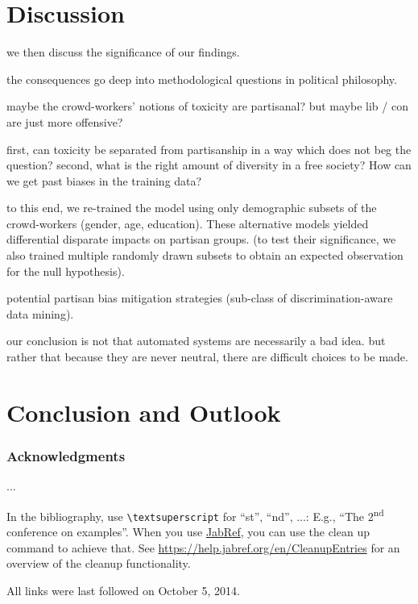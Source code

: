 \documentclass[runningheads,a4paper]{llncs}
\begin{document}
\section{Discussion}

we then discuss the significance of our findings.

the consequences go deep into methodological questions in political philosophy.

maybe the crowd-workers’ notions of toxicity are partisanal?
but maybe lib / con are just more offensive?

first, can toxicity be separated from partisanship in a way which does not beg the question?
second, what is the right amount of diversity in a free society?
How can we get past biases in the training data?

to this end, we re-trained the model using only demographic subsets of the crowd-workers (gender, age, education). These alternative models yielded differential disparate impacts on partisan groups. (to test their significance, we also trained multiple randomly drawn subsets to obtain an expected observation for the null hypothesis).

potential partisan bias mitigation strategies (sub-class of discrimination-aware data mining).

our conclusion is not that automated systems are necessarily a bad idea. but rather that because they are never neutral, there are difficult choices to be made.


\section{Conclusion and Outlook}

\subsubsection*{Acknowledgments}
...

In the bibliography, use \texttt{\textbackslash textsuperscript} for ``st'', ``nd'', ...:
E.g., \enquote{The 2\textsuperscript{nd} conference on examples}.
When you use \href{https://www.jabref.org}{JabRef}, you can use the clean up command to achieve that.
See \url{https://help.jabref.org/en/CleanupEntries} for an overview of the cleanup functionality.




All links were last followed on October 5, 2014.
\end{document}
